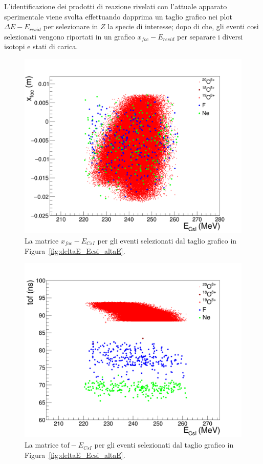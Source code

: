 L'identificazione dei prodotti di reazione rivelati con l'attuale apparato sperimentale viene svolta effettuando dapprima un taglio grafico nei plot $\Delta E - E_{resid}$ per selezionare in $Z$ la specie di interesse; dopo di che, gli eventi così selezionati vengono riportati in un grafico $x_{foc} - E_{resid}$ per separare i diversi isotopi e stati di carica. 
\begin{figure} [!p]
	\centering
	\includegraphics[width=\textwidth, keepaspectratio]{Grafici_Tesi2/PID/xf_csi_taglio2.png}
	\caption{La matrice $x_{foc} - E_{CsI}$ per gli eventi selezionati dal taglio grafico in Figura~\ref{fig:deltaE_Ecsi_altaE}.} \label{fig:xf_Ecsi_O20a}
\end{figure}
\begin{figure} [!p]
	\centering
	\includegraphics[width=\textwidth, keepaspectratio]{Grafici_Tesi2/PIDnew/tof_csi_taglio2.png}
	\caption{La matrice $\mbox{tof} - E_{CsI}$ per gli eventi selezionati dal taglio grafico in Figura~\ref{fig:deltaE_Ecsi_altaE}.} \label{fig:tof_Ecsi_O20a}
\end{figure} 

